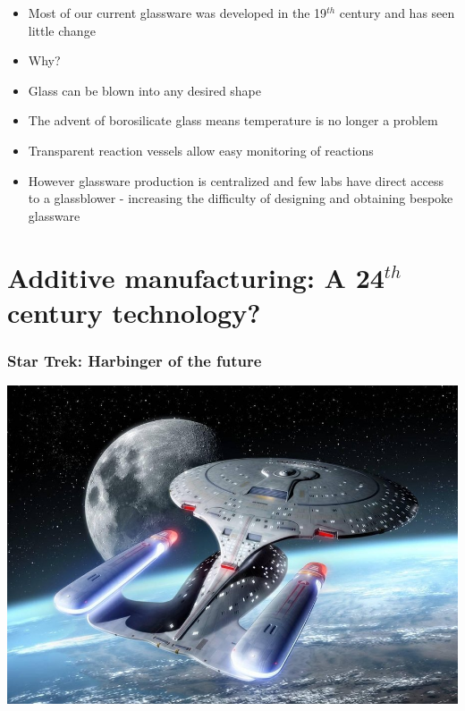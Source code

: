 \documentclass[10pt, compress]{beamer}
\begin{document}
\begin{frame}[fragile]
\begin{itemize}
	\item{ Most of our current glassware was developed in the 19$^{th}$ century and has seen little change}
    \item{Why?}
    \item{Glass can be blown into any desired shape}
    \item{The advent of borosilicate glass means temperature is no longer a problem}
    \item{Transparent reaction vessels allow easy monitoring of reactions}
    \item{\color{red}However glassware production is centralized and few labs have direct access to a glassblower - increasing the difficulty of designing and obtaining bespoke glassware} 
\end{itemize}
\end{frame}

\section{Additive manufacturing: A 24$^{th}$ century technology?}
\begin{frame}[fragile]
\frametitle{Star Trek: Harbinger of the future}\vspace{-1cm}
\begin{center}\includegraphics[scale=0.43]{enterprise.png}\end{center}

\end{frame}
\end{document}
